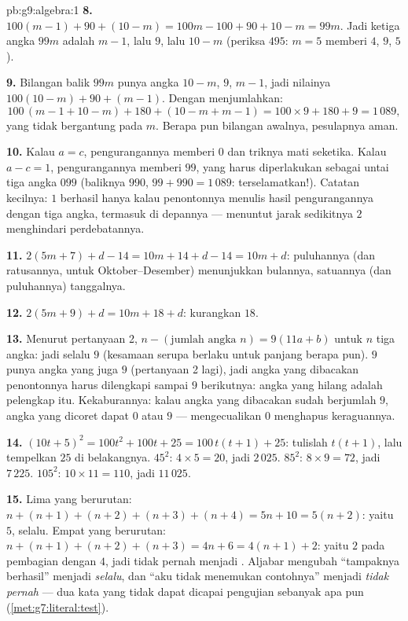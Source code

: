 \begin{solution}{pb:g9:algebra:1}
\textbf{8.} $100(m - 1) + 90 + (10 - m) = 100m - 100 + 90 + 10
- m = 99m$. Jadi ketiga angka $99m$ adalah $m - 1$, lalu $9$,
lalu $10 - m$ (periksa $495$: $m = 5$ memberi $4$, $9$, $5$).

\textbf{9.} Bilangan balik $99m$ punya angka $10 - m$, $9$,
$m - 1$, jadi nilainya $100(10 - m) + 90 + (m - 1)$. Dengan menjumlahkan:
\[
100\,(m - 1 + 10 - m) + 180 + (10 - m + m - 1)
= 100 \times 9 + 180 + 9 = 1\,089 ,
\]
yang tidak bergantung pada $m$. Berapa pun bilangan awalnya,
pesulapnya aman.

\textbf{10.} Kalau $a = c$, pengurangannya memberi $0$ dan triknya
mati seketika. Kalau $a - c = 1$, pengurangannya memberi $99$, yang
harus diperlakukan sebagai untai tiga angka $099$ (baliknya $990$,
$99 + 990 = 1\,089$: terselamatkan!). Catatan kecilnya: 
$1$ berhasil hanya kalau penontonnya menulis hasil pengurangannya
dengan tiga angka, termasuk  di depannya --- menuntut jarak
sedikitnya $2$ menghindari perdebatannya.

\textbf{11.} $2(5m + 7) + d - 14 = 10m + 14 + d - 14 =
10m + d$: puluhannya (dan ratusannya, untuk Oktober--Desember)
menunjukkan bulannya, satuannya (dan puluhannya) tanggalnya.

\textbf{12.} $2(5m + 9) + d = 10m + 18 + d$: kurangkan $18$.

\textbf{13.} Menurut pertanyaan 2, $n - (\text{jumlah angka } n) =
9(11a + b)$ untuk $n$ tiga angka: jadi selalu  $9$
(kesamaan serupa berlaku untuk panjang berapa pun).  $9$
punya  angka yang juga  $9$ (pertanyaan 2 lagi), jadi
angka yang dibacakan penontonnya harus dilengkapi sampai 
$9$ berikutnya: angka yang hilang adalah pelengkap itu. Kekaburannya:
kalau angka yang dibacakan sudah berjumlah  $9$, angka yang
dicoret dapat $0$ atau $9$ --- mengecualikan $0$ menghapus keraguannya.

\textbf{14.} $(10t + 5)^2 = 100t^2 + 100t + 25 =
100\,t(t + 1) + 25$: tulislah $t(t+1)$, lalu tempelkan $25$ di
belakangnya. $45^2$: $4 \times 5 = 20$, jadi $2\,025$. $85^2$:
$8 \times 9 = 72$, jadi $7\,225$. $105^2$: $10 \times 11 = 110$,
jadi $11\,025$.

\textbf{15.} Lima yang berurutan: $n + (n+1) + (n+2) + (n+3) +
(n+4) = 5n + 10 = 5(n + 2)$: yaitu  $5$, selalu. Empat
yang berurutan: $n + (n+1) + (n+2) + (n+3) = 4n + 6 =
4(n + 1) + 2$: yaitu  $2$ pada pembagian dengan $4$, jadi tidak
pernah menjadi . Aljabar mengubah ``tampaknya berhasil'' menjadi
\emph{selalu}, dan ``aku tidak menemukan contohnya'' menjadi
\emph{tidak pernah} --- dua kata yang tidak dapat dicapai pengujian
sebanyak apa pun (\cref{met:g7:literal:test}).

\end{solution}
